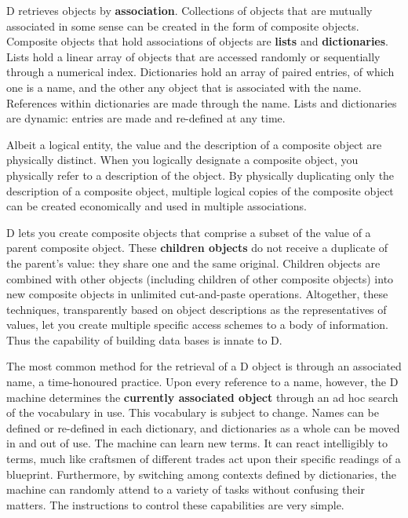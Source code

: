D  retrieves  objects by \textbf{association}.  Collections of objects  that  are mutually associated in some sense can be created in the form of composite objects.  Composite  objects that hold associations of objects are  \textbf{lists} and  \textbf{dictionaries}.  Lists  hold  a linear array of objects  that  are  accessed randomly or sequentially through a numerical index.  Dictionaries hold an array of paired entries, of which one is a name, and the other any object that is associated with the name.  References within  dictionaries are made through the name.  Lists and dictionaries are dynamic:  entries are  made and re-defined at any time.

Albeit  a logical entity,  the value and the description of a  composite object are physically distinct.  When you logically designate a composite object,  you  physically  refer  to  a  description  of  the  object.  By physically  duplicating  only  the description  of  a  composite  object, multiple   logical  copies  of  the  composite  object  can  be   created economically and used in multiple associations.

D  lets you create composite objects that comprise a subset  of  the value of a parent composite object. These \textbf{children objects} do not receive a duplicate of the parent's value:  they share one and the same original. Children  objects are combined with other objects (including children  of other composite objects) into new composite objects in unlimited cut-and-paste operations.  Altogether,  these techniques,  transparently based on object  descriptions  as the representatives of values,  let  you  create multiple specific access schemes to a body of information. Thus the capability of building data bases is innate to D.

The  most  common method for the retrieval of a D object is  through  an associated  name,  a time-honoured practice.  Upon every reference  to  a name,  however,  the D machine determines the \textbf{currently associated object} through  an ad hoc search of the vocabulary in use.  This  vocabulary  is subject to change. Names can be defined or re-defined in each dictionary, and  dictionaries as a whole can be moved in and out of  use.  The machine  can  learn new  terms. It can react intelligibly to terms, much like craftsmen of different trades act upon their specific readings of a blueprint.  Furthermore,  by switching among contexts defined by dictionaries, the machine can randomly attend to a variety of tasks without confusing their matters.  The instructions to  control  these capabilities are very simple. 

